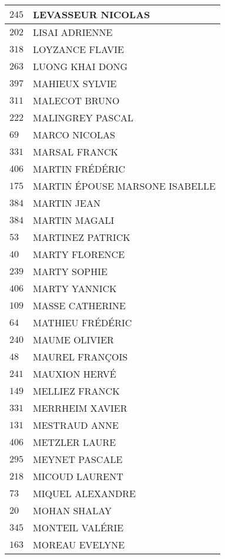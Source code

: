 \begin{xltabular}{\linewidth}{|l|X|}
    $245$ & LEVASSEUR NICOLAS \\
    \hline
    $202$ & LISAI ADRIENNE \\
    \hline
    $318$ & LOYZANCE FLAVIE \\
    \hline
    $263$ & LUONG KHAI DONG \\
    \hline
    $397$ & MAHIEUX SYLVIE \\
    \hline
    $311$ & MALECOT BRUNO \\
    \hline
    $222$ & MALINGREY PASCAL \\
    \hline
    $69$ & MARCO NICOLAS \\
    \hline
    $331$ & MARSAL FRANCK \\
    \hline
    $406$ & MARTIN FRÉDÉRIC \\
    \hline
    $175$ & MARTIN ÉPOUSE MARSONE ISABELLE \\
    \hline
    $384$ & MARTIN JEAN \\
    \hline
    $384$ & MARTIN MAGALI \\
    \hline
    $53$ & MARTINEZ PATRICK \\
    \hline
    $40$ & MARTY FLORENCE \\
    \hline
    $239$ & MARTY SOPHIE \\
    \hline
    $406$ & MARTY YANNICK \\
    \hline
    $109$ & MASSE CATHERINE \\
    \hline
    $64$ & MATHIEU FRÉDÉRIC \\
    \hline
    $240$ & MAUME OLIVIER \\
    \hline
    $48$ & MAUREL FRANÇOIS \\
    \hline
    $241$ & MAUXION HERVÉ \\
    \hline
    $149$ & MELLIEZ FRANCK \\
    \hline
    $331$ & MERRHEIM XAVIER \\
    \hline
    $131$ & MESTRAUD ANNE \\
    \hline
    $406$ & METZLER LAURE \\
    \hline
    $295$ & MEYNET PASCALE \\
    \hline
    $218$ & MICOUD LAURENT \\
    \hline
    $73$ & MIQUEL ALEXANDRE \\
    \hline
    $20$ & MOHAN SHALAY \\
    \hline
    $345$ & MONTEIL VALÉRIE \\
    \hline
    $163$ & MOREAU EVELYNE \\
    \hline

\end{xltabular}
